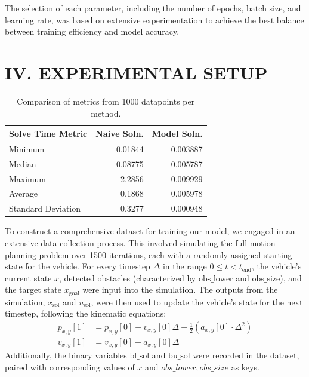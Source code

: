 \documentclass[
	letterpaper, %
	10pt, %
	unnumberedsections, %
	twoside, %
]{LTJournalArticle}
\begin{document}
The selection of each parameter, including the number of epochs, batch size, and learning rate, was based on extensive experimentation to achieve the best balance between training efficiency and model accuracy.

\section{IV. EXPERIMENTAL SETUP}

\begin{table}
    \caption{Comparison of metrics from 1000 datapoints per method.}
    \centering
    \begin{tabular}{l r r}
        \toprule
        Solve Time Metric & Naive Soln. & Model Soln. \\
        \midrule
        Minimum & 0.01844  & 0.003887 \\
        Median  & 0.08775  & 0.005787 \\
        Maximum & 2.2856   & 0.009929 \\
        Average & 0.1868   & 0.005978 \\
        Standard Deviation & 0.3277 & 0.000948 \\
        \bottomrule
    \end{tabular}
\end{table}

\quad To construct a comprehensive dataset for training our model, we engaged in an extensive data collection process. This involved simulating the full motion planning problem over 1500 iterations, each with a randomly assigned starting state for the vehicle. For every timestep $\Delta$ in the range $0 \leq t < t_{\text{end}}$, the vehicle's current state $x$, detected obstacles (characterized by $\text{obs\_lower}$ and $\text{obs\_size}$), and the target state $x_{\text{goal}}$ were input into the simulation. The outputs from the simulation, $x_{\text{sol}}$ and $u_{\text{sol}}$, were then used to update the vehicle's state for the next timestep, following the kinematic equations:
\begin{align*}
    p_{x, y}[1] &= p_{x, y}[0] + v_{x, y}[0] \Delta + \frac{1}{2} (a_{x, y}[0] \cdot \Delta^2) \\
    v_{x, y}[1] &= v_{x, y}[0] + a_{x, y}[0] \Delta
\end{align*}
Additionally, the binary variables $\text{bl\_sol}$ and $\text{bu\_sol}$ were recorded in the dataset, paired with corresponding values of $x$ and \(obs\_lower, obs\_size\) as keys.
\end{document}
